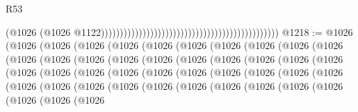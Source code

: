 \begin{lexlean}{R53}
\begin{coremodule}
                                                                                              (@1026
                                                                                                (@1026
                                                                                                  @1122)))))))))))))))))))))))))))))))))))))))))))))))
@1218 := @1026
    (@1026
      (@1026
        (@1026
          (@1026
            (@1026
              (@1026
                (@1026
                  (@1026
                    (@1026
                      (@1026
                        (@1026
                          (@1026
                            (@1026
                              (@1026
                                (@1026
                                  (@1026
                                    (@1026
                                      (@1026
                                        (@1026
                                          (@1026
                                            (@1026
                                              (@1026
                                                (@1026
                                                  (@1026
                                                    (@1026
                                                      (@1026
                                                        (@1026
                                                          (@1026
                                                            (@1026
                                                              (@1026
                                                                (@1026
                                                                  (@1026
                                                                    (@1026
                                                                      (@1026
                                                                        (@1026
                                                                          (@1026
                                                                            (@1026
                                                                              (@1026
                                                                                (@1026
                                                                                  (@1026
                                                                                    (@1026
                                                                                      (@1026
                                                                                        (@1026

\end{coremodule}
\end{lexlean}
